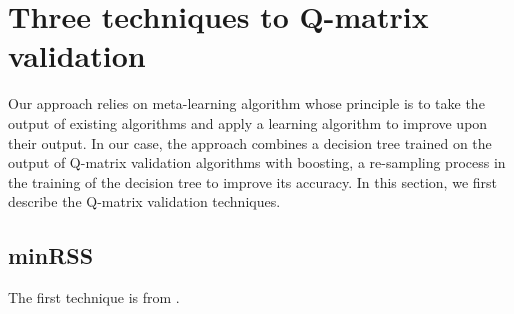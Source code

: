 \documentclass{edm_template}
\begin{document}


\section{Three techniques to Q-matrix validation}

Our approach relies on meta-learning algorithm whose principle is to take the output of existing algorithms and apply a learning algorithm to improve upon their output.  In our case, the approach combines a decision tree trained on the output of Q-matrix validation algorithms with boosting, a re-sampling process in the training of the decision tree to improve its accuracy.  In this section, we first describe the Q-matrix validation techniques.

\subsection{minRSS}
The first technique is from .
\end{document}
